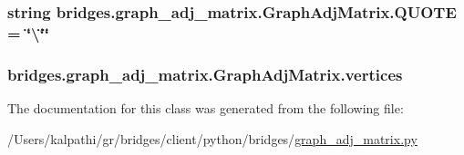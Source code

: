 \subsubsection[{Q\+U\+O\+T\+E}]{\setlength{\rightskip}{0pt plus 5cm}string bridges.\+graph\+\_\+adj\+\_\+matrix.\+Graph\+Adj\+Matrix.\+Q\+U\+O\+T\+E = \char`\"{}\textbackslash{}\char`\"{}\char`\"{}\hspace{0.3cm}{\ttfamily [static]}}\label{classbridges_1_1graph__adj__matrix_1_1_graph_adj_matrix_ade1158c482ee3e40b1fa2b106933feac}
\hypertarget{classbridges_1_1graph__adj__matrix_1_1_graph_adj_matrix_abc6ac2ef7b1328a9d88027f2763cecfc}{}
\subsubsection[{vertices}]{\setlength{\rightskip}{0pt plus 5cm}bridges.\+graph\+\_\+adj\+\_\+matrix.\+Graph\+Adj\+Matrix.\+vertices}\label{classbridges_1_1graph__adj__matrix_1_1_graph_adj_matrix_abc6ac2ef7b1328a9d88027f2763cecfc}


The documentation for this class was generated from the following file\+:\begin{DoxyCompactItemize}
\item 
/\+Users/kalpathi/gr/bridges/client/python/bridges/\hyperlink{graph__adj__matrix_8py}{graph\+\_\+adj\+\_\+matrix.\+py}\end{DoxyCompactItemize}
